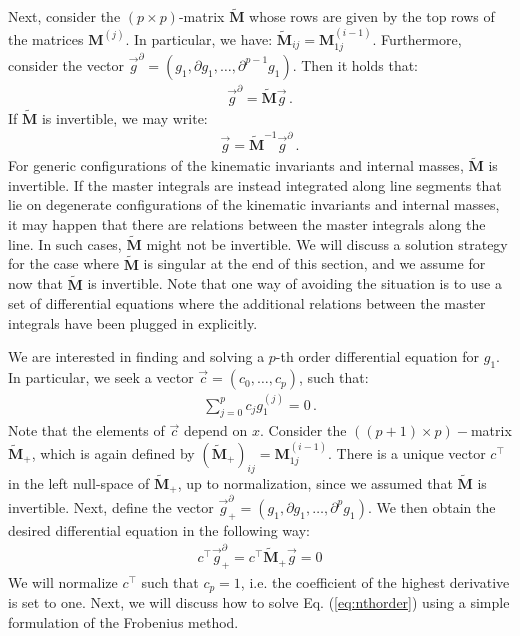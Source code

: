 \documentclass{article}
\begin{document}
Next, consider the $(p \times p)$-matrix $\tilde{\mathbf{M}}$ whose rows are given by the top rows of the matrices $\mathbf{M}^{(j)}$. In particular, we have: $\tilde{\mathbf{M}}_{ij} = \mathbf{M}^{(i-1)}_{1j}$. Furthermore, consider the vector $\vec{g}^\partial = (g_1,\partial g_1, \ldots, \partial^{p-1} g_1)$. Then it holds that:
\begin{align}
    \label{eq:gpartvec}
    \vec{g}^\partial = \tilde{\mathbf{M}} \vec{g}\,.
\end{align}
If $\tilde{\mathbf{M}}$ is invertible, we may write:
\begin{align}
    \label{eq:relatepartials}
    \vec{g} = \tilde{\mathbf{M}}^{-1} \vec{g}^\partial \,.
\end{align}
For generic configurations of the kinematic invariants and internal masses, $\tilde{\mathbf{M}}$ is invertible. If the master integrals are instead integrated along line segments that lie on degenerate configurations of the kinematic invariants and internal masses, it may happen that there are relations between the master integrals along the line. In such cases, $\tilde{\mathbf{M}}$ might not be invertible. %
We will discuss a solution strategy for the case where $\tilde{\mathbf{M}}$ is singular at the end of this section, and we assume for now that $\tilde{\mathbf{M}}$ is invertible. Note that one way of avoiding the situation is to use a set of differential equations where the additional relations between the master integrals have been plugged in explicitly.

We are interested in finding and solving a $p$-th order differential equation for $g_1$. In particular, we seek a vector $\vec{c} = (c_{0}, \ldots, c_p)$, such that:
\begin{align}
    \label{eq:nthorder}
    \sum_{j=0}^p c_{j} g_1^{(j)} = 0\,.
\end{align}
Note that the elements of $\vec{c}$ depend on $x$. Consider the $((p+1)\times p)-$matrix $\tilde{\mathbf{M}}_+$, which is again defined by $(\tilde{\mathbf{M}}_+)_{ij} = \mathbf{M}^{(i-1)}_{1j}$. There is a unique vector $c^\intercal$ in the left null-space of $\tilde{\mathbf{M}}_+$, up to normalization, since we assumed that $\tilde{\mathbf{M}}$ is invertible. Next, define the vector $\vec{g}_+^\partial = (g_1,\partial g_1, \ldots, \partial^{p} g_1)$. We then obtain the desired differential equation in the following way:
\begin{align}
    c^\intercal \vec{g}^\partial_+ = c^\intercal\tilde{\mathbf{M}}_+\vec{g} = 0
\end{align}
We will normalize $c^\intercal$ such that $c_p=1$, i.e. the coefficient of the highest derivative is set to one. Next, we will discuss how to solve Eq. (\ref{eq:nthorder}) using a simple formulation of the Frobenius method. 
\end{document}
